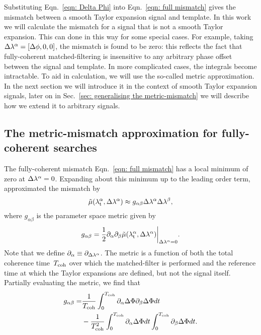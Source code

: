 \documentclass[../full_thesis/full_thesis.tex]{subfiles}
\begin{document}
Substituting Eqn.~\eqref{eqn: Delta Phi} into Eqn.~\eqref{eqn: full mismatch}
gives the mismatch between a smooth Taylor expansion signal and template. In
this work we will calculate the mismatch for a signal that is not a smooth
Taylor expansion. This can done in this way for some special cases. For
example, taking $\Delta\lambda^{\alpha} = [\Delta\phi, 0, 0]$, the mismatch is found to be
zero: this reflects the fact that fully-coherent matched-filtering is
insensitive to any arbitrary phase offset between the signal and template. In
more complicated cases, the integrals become intractable. To aid in
calculation, we will use the so-called metric approximation. In the next section
we will introduce it in the context of smooth Taylor expansion signals, later on
in Sec.~\ref{sec: generalising the metric-mismatch} we will describe how we
extend it to arbitrary signals.

\subsection{The metric-mismatch approximation for fully-coherent searches}
\label{sec: the metric-mismatch approximation for fully-coherent searches}

The fully-coherent mismatch Eqn.~\eqref{eqn: full mismatch} has a local
minimum of zero at $\Delta\lambda^{\alpha}=0$. Expanding about this minimum up to the
leading order term, \citet{Brady1998} approximated the mismatch by
\begin{equation}
\tilde{\mu}({\lambda}_\textrm{t}^{\alpha}, \Delta\lambda^{\alpha}) \approx
g_{\alpha\beta}\Delta\lambda^{\alpha}\Delta\lambda^{\beta},
\label{eqn: mismatch metric single}
\end{equation}
where $g_{\alpha\beta}$ is the parameter space metric given by
\begin{equation}
    g_{\alpha\beta} =
    \frac{1}{2}\partial_{\alpha}\partial_{\beta}
    \tilde{\mu}({\lambda}_\textrm{t}^{\alpha}, \Delta\lambda^{\alpha}) \biggr\rvert_{\Delta\lambda^{\alpha}=0}.
\end{equation}
Note that we define $\partial_{\alpha} \equiv \partial_{\Delta\lambda^{\alpha}}$.
The metric is a function  of both the total coherence time~$T_{\mathrm{coh}}$ over which the
matched-filter is performed and the reference time at which the Taylor expansions
are defined, but not the signal itself. Partially evaluating the metric, we find that
\begin{align}
\begin{split}
    g_{\alpha \beta} = &
    \frac{1}{T_{\mathrm{coh}}}\int_{0}^{T_{\mathrm{coh}}}\partial_{\alpha}\Delta\Phi
                               \partial_{\beta}\Delta\Phi dt \\
   & -\frac{1}{T_{\mathrm{coh}}^{2}}\int_{0}^{T_{\mathrm{coh}}} \partial_{\alpha}\Delta\Phi dt
                 \int_{0}^{T_{\mathrm{coh}}} \partial_{\beta}\Delta\Phi dt.
\end{split}
\label{eqn: fully-coherent metric simple}
\end{align}
\end{document}
